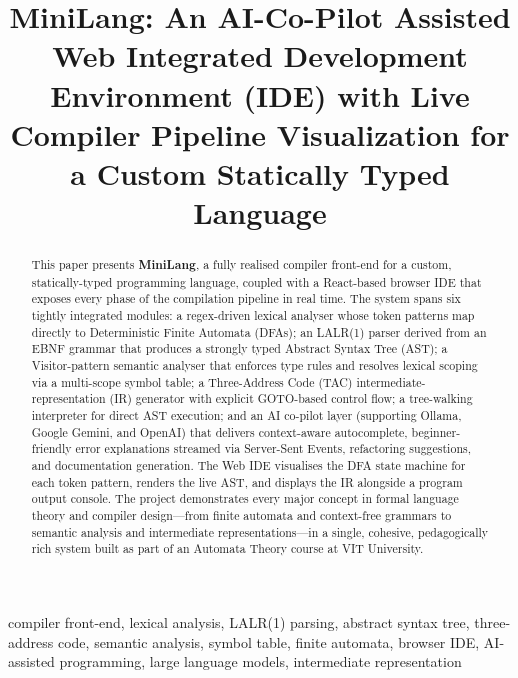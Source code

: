 \documentclass[conference]{IEEEtran}
\begin{document}
\title{MiniLang: An AI-Co-Pilot Assisted Web Integrated Development Environment (IDE) with Live Compiler Pipeline Visualization for a Custom Statically Typed Language}

\author{
}

\maketitle

\begin{abstract}
This paper presents \textbf{MiniLang}, a fully realised compiler
front-end for a custom, statically-typed programming language, coupled
with a React-based browser IDE that exposes every phase of the
compilation pipeline in real time. The system spans six tightly
integrated modules: a regex-driven lexical analyser whose token
patterns map directly to Deterministic Finite Automata (DFAs); an
LALR(1) parser derived from an EBNF grammar that produces a strongly
typed Abstract Syntax Tree (AST); a Visitor-pattern semantic analyser
that enforces type rules and resolves lexical scoping via a multi-scope
symbol table; a Three-Address Code (TAC) intermediate-representation
(IR) generator with explicit GOTO-based control flow; a tree-walking
interpreter for direct AST execution; and an AI co-pilot layer
(supporting Ollama, Google Gemini, and OpenAI) that delivers
context-aware autocomplete, beginner-friendly error explanations
streamed via Server-Sent Events, refactoring suggestions, and
documentation generation. The Web IDE visualises the DFA state machine
for each token pattern, renders the live AST, and displays the IR
alongside a program output console. The project demonstrates every
major concept in formal language theory and compiler design---from
finite automata and context-free grammars to semantic analysis and
intermediate representations---in a single, cohesive, pedagogically
rich system built as part of an Automata Theory course at VIT University.
\end{abstract}

\begin{IEEEkeywords}
compiler front-end, lexical analysis, LALR(1) parsing, abstract syntax
tree, three-address code, semantic analysis, symbol table, finite
automata, browser IDE, AI-assisted programming, large language models,
intermediate representation
\end{IEEEkeywords}
\end{document}
